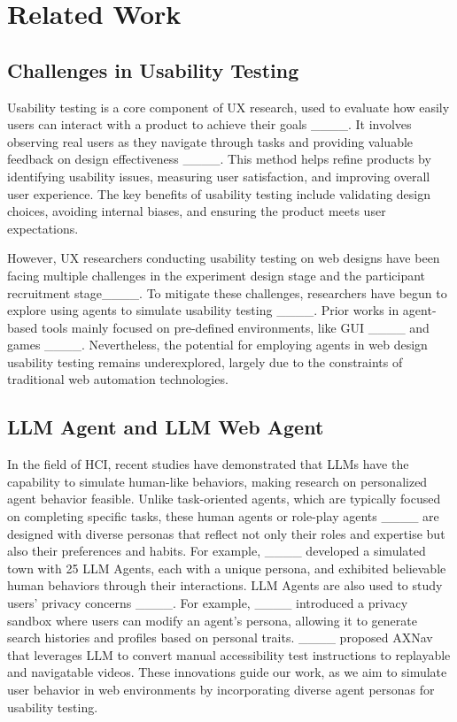 \section{Related Work}
\subsection{Challenges in Usability Testing}
Usability testing is a core component of UX research, used to evaluate how easily users can interact with a product to achieve their goals ____.
It involves observing real users as they navigate through tasks and providing valuable feedback on design effectiveness ____. 
This method helps refine products by identifying usability issues, measuring user satisfaction, and improving overall user experience. The key benefits of usability testing include validating design choices, avoiding internal biases, and ensuring the product meets user expectations.

However, UX researchers conducting usability testing on web designs have been facing multiple challenges in the experiment design stage and the participant recruitment stage____.
To mitigate these challenges, researchers have begun to explore using agents to simulate usability testing ____.
Prior works in agent-based tools mainly focused on pre-defined environments, like GUI ____ and games ____.
Nevertheless, the potential for employing agents in web design usability testing remains underexplored, largely due to the constraints of traditional web automation technologies.

\subsection{LLM Agent and LLM Web Agent}

In the field of HCI, recent studies have demonstrated that LLMs have the capability to simulate human-like behaviors, making research on personalized agent behavior feasible. Unlike task-oriented agents, which are typically focused on completing specific tasks, these human agents or role-play agents ____ are designed with diverse personas that reflect not only their roles and expertise but also their preferences and habits. For example, ____ developed a simulated town with 25 LLM Agents, each with a unique persona, and exhibited believable human behaviors through their interactions. 
LLM Agents are also used to study users' privacy concerns ____. For example, ____ introduced a privacy sandbox where users can modify an agent’s persona, allowing it to generate search histories and profiles based on personal traits.
____ proposed AXNav that leverages LLM to convert manual accessibility test instructions to replayable and navigatable videos.
These innovations guide our work, as we aim to simulate user behavior in web environments by incorporating diverse agent personas for usability testing.

